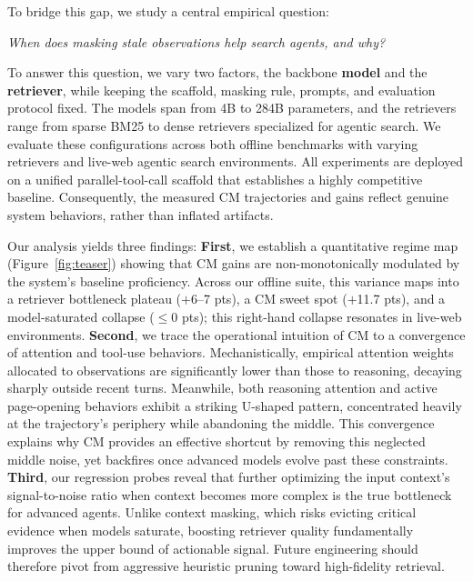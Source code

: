 To bridge this gap, we study a central empirical question:

\begin{center}
    \vspace{-0.5em}
    \textit{When does masking stale observations help search agents, and why?}
    \vspace{-0.5em}
\end{center}


To answer this question, we vary two factors, the backbone \textbf{model} and the \textbf{retriever}, while keeping the scaffold, masking rule, prompts, and evaluation protocol fixed.
The models span from 4B to 284B parameters, and the retrievers range from sparse BM25 to dense retrievers specialized for agentic search.
We evaluate these configurations across both offline benchmarks with varying retrievers and live-web agentic search environments. 
All experiments are deployed on a unified parallel-tool-call scaffold that establishes a highly competitive baseline. Consequently, the measured CM trajectories and gains reflect genuine system behaviors, rather than inflated artifacts.

Our analysis yields three findings: 
\textbf{First}, we establish a quantitative regime map (Figure~\ref{fig:teaser}) showing that CM gains are non-monotonically modulated by the system's baseline proficiency. Across our offline suite, this variance maps into a retriever bottleneck plateau ($+$6--7 pts), a CM sweet spot ($+$11.7 pts), and a model-saturated collapse ($\leq$0 pts); this right-hand collapse resonates in live-web environments.
\textbf{Second}, we trace the operational intuition of CM to a convergence of attention and tool-use behaviors. Mechanistically, empirical attention weights allocated to observations are significantly lower than those to reasoning, decaying sharply outside recent turns. Meanwhile, both reasoning attention and active page-opening behaviors exhibit a striking U-shaped pattern, concentrated heavily at the trajectory's periphery while abandoning the middle. This convergence explains why CM provides an effective shortcut by removing this neglected middle noise, yet backfires once advanced models evolve past these constraints.
\textbf{Third}, our regression probes reveal that further optimizing the input context's signal-to-noise ratio when context becomes more complex is the true bottleneck for advanced agents. Unlike context masking, which risks evicting critical evidence when models saturate, boosting retriever quality fundamentally improves the upper bound of actionable signal. Future engineering should therefore pivot from aggressive heuristic pruning toward high-fidelity retrieval.
